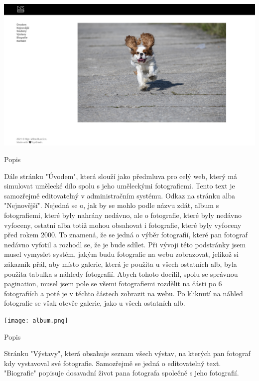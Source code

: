 \documentclass[12pt,a4paper]{report}
\begin{document}
  \vspace*{0.5cm}
  \noindent\includegraphics[width=\linewidth]{dmp-bures.png}
  \begin{center}
    Popis
  \end{center}
  \vspace*{0.5cm}

  Dále stránku "Úvodem", která slouží jako předmluva pro celý web, který má simulovat umělecké
  dílo spolu s jeho uměleckými fotografiemi. Tento text je samozřejmě editovatelný v
  administračním systému.
  Odkaz na stránku alba "Nejnovější". Nejedná se o, jak by se mohlo podle názvu zdát, album s
  fotografiemi, které byly nahrány nedávno, ale o fotografie, které byly nedávno vyfoceny, ostatní
  alba totiž mohou obsahovat i fotografie, které byly vyfoceny před rokem 2000. To znamená, že se
  jedná o výběr fotografií, které pan fotograf nedávno vyfotil a rozhodl se, že je bude sdílet. Při
  vývoji této podstránky jsem musel vymyslet systém, jakým budu fotografie na webu zobrazovat,
  jelikož si zákazník přál, aby místo galerie, která je použita u všech ostatních alb, byla použita
  tabulka s náhledy fotografií. Abych tohoto docílil, spolu se správnou pagination, musel jsem pole
  se všemi fotografiemi rozdělit na části po 6 fotografiích a poté je v těchto částech zobrazit na
  webu. Po kliknutí na náhled fotografie se však otevře galerie, jako u všech ostatních alb.
  
  \vspace*{0.5cm}
  \noindent\texttt{[image: album.png]}
  \begin{center}
    Popis
  \end{center}
  \vspace*{0.5cm}
 
  Stránku "Výstavy", která obsahuje seznam všech výstav, na kterých pan fotograf kdy vystavoval
  své fotografie. Samozřejmě se jedná o editovatelný text.
  "Biografie" popisuje dosavadní život pana fotografa společně s jeho fotografií.
  
\end{document}
